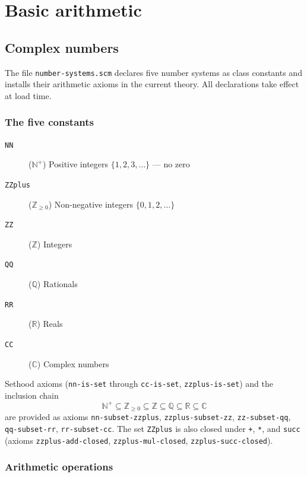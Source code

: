 \documentclass{amsbook}[openany]
\theoremstyle{definition}
\theoremstyle{remark}
\theoremstyle{remark}
\begin{document}
\section{Basic arithmetic}
\label{sec:basic-arith}

\subsection{Complex numbers} \label{sec:nums}

The file \texttt{number-systems.scm} declares five number systems as
class constants and installs their arithmetic axioms in the current
theory.  All declarations take effect at load time.

\subsubsection{The five constants}

\begin{description}
\item[\texttt{NN}] ($\mathbb{N}^+$) Positive integers $\{1, 2, 3, \ldots\}$ --- no zero
\item[\texttt{ZZplus}] ($\mathbb{Z}_{\geq 0}$) Non-negative integers $\{0, 1, 2, \ldots\}$
\item[\texttt{ZZ}] ($\mathbb{Z}$) Integers
\item[\texttt{QQ}] ($\mathbb{Q}$) Rationals
\item[\texttt{RR}] ($\mathbb{R}$) Reals
\item[\texttt{CC}] ($\mathbb{C}$) Complex numbers
\end{description}

Sethood axioms (\texttt{nn-is-set} through \texttt{cc-is-set},
\texttt{zzplus-is-set}) and the inclusion chain
\[
  \mathbb{N}^+ \subseteq \mathbb{Z}_{\geq 0} \subseteq \mathbb{Z}
                \subseteq \mathbb{Q} \subseteq \mathbb{R} \subseteq \mathbb{C}
\]
are provided as axioms \texttt{nn-subset-zzplus},
\texttt{zzplus-subset-zz}, \texttt{zz-subset-qq},
\texttt{qq-subset-rr}, \texttt{rr-subset-cc}.  The set
\texttt{ZZplus} is also closed under \texttt{+}, \texttt{*}, and
\texttt{succ} (axioms \texttt{zzplus-add-closed},
\texttt{zzplus-mul-closed}, \texttt{zzplus-succ-closed}).

\subsubsection{Arithmetic operations}
\end{document}
